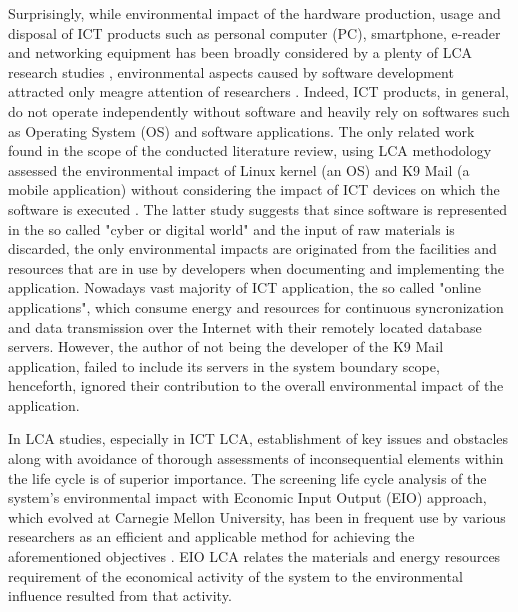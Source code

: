 \documentclass[conference]{IEEEtran}
\begin{document}
Surprisingly, while environmental impact of the hardware production, usage and disposal of ICT products such as personal computer (PC), smartphone, e-reader and networking equipment has been broadly considered by a plenty of LCA research studies \cite{guldbrandsson2012opportunities, Bull201410, farrant2012environmental, enroth2009,koljonen2008environmental}, environmental aspects caused by software development attracted only meagre attention of researchers \cite{Moshnyaga:2013}. Indeed, ICT products, in general, do not operate independently without software and heavily rely on softwares such as Operating System (OS) and software applications. The only related work found in the scope of the conducted literature review, using LCA methodology assessed the environmental impact of Linux kernel (an OS)  and K9 Mail (a mobile application) without considering the impact of ICT devices on which the software is executed \cite{moshnyaga2013assessment,Moshnyaga:2013}. The latter study suggests that since software is represented in the so called "cyber or digital world" and the input of raw materials is discarded, the only environmental impacts are originated from the facilities and resources that are in use by developers when documenting and implementing the application. Nowadays vast majority of ICT application, the so called "online applications", which consume energy and resources for continuous syncronization and data transmission over the Internet with their remotely located database servers. However, the author of \cite{Moshnyaga:2013} not being the developer of the K9 Mail application, failed to include its servers in the system boundary scope, henceforth, ignored their contribution to the overall environmental impact of the application.

In LCA studies, especially in ICT LCA, establishment of key issues and obstacles along with avoidance of thorough assessments of inconsequential elements within the life cycle is of superior importance. The screening life cycle analysis of the system's environmental impact with Economic Input Output (EIO) approach, which evolved at Carnegie Mellon University, has been in frequent use by various researchers as an efficient and applicable method for achieving the aforementioned objectives \cite{1208069, junnila2008life, matthews2000extending}. EIO LCA relates the materials and energy resources requirement of the economical activity of the system to the environmental influence resulted from that activity.

\end{document}
